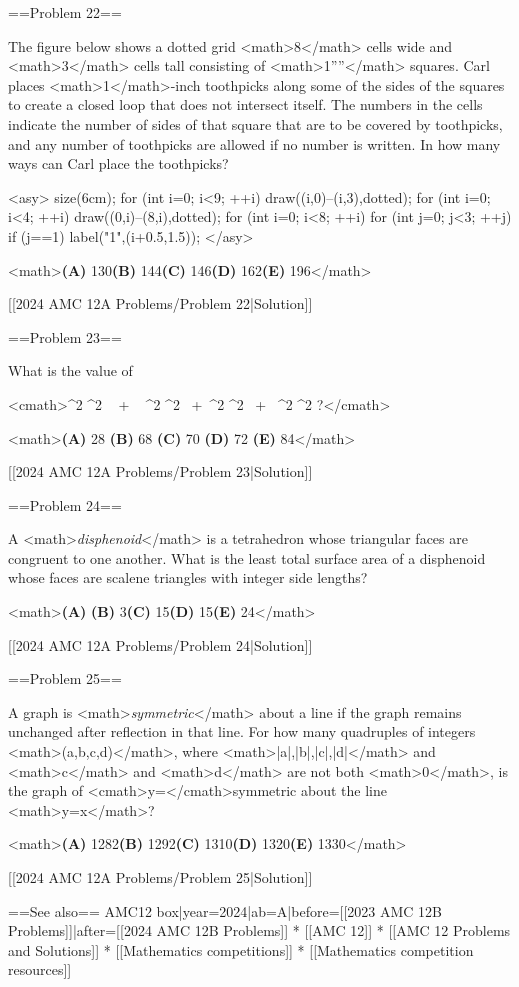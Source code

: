 ==Problem 22==

The figure below shows a dotted grid <math>8</math> cells wide and <math>3</math> cells tall consisting of <math>1''''</math> squares. Carl places <math>1</math>-inch toothpicks along some of the sides of the squares to create a closed loop that does not intersect itself. The numbers in the cells indicate the number of sides of that square that are to be covered by toothpicks, and any number of toothpicks are allowed if no number is written. In how many ways can Carl place the toothpicks?

<asy>
size(6cm);
for (int i=0; i<9; ++i) {
  draw((i,0)--(i,3),dotted);
}
for (int i=0; i<4; ++i){
  draw((0,i)--(8,i),dotted);
}
for (int i=0; i<8; ++i) {
  for (int j=0; j<3; ++j) {
    if (j==1) {
      label("1",(i+0.5,1.5));
}}}
</asy>

<math>\textbf{(A) }130\qquad\textbf{(B) }144\qquad\textbf{(C) }146\qquad\textbf{(D) }162\qquad\textbf{(E) }196</math>

[[2024 AMC 12A Problems/Problem 22|Solution]]

==Problem 23==

What is the value of 

<cmath>\tan^2  \cdot \tan^2 ~ + ~ \tan^2  \cdot \tan^2  ~+~\tan^2  \cdot \tan^2  ~+~ \tan^2  \cdot \tan^2 ?</cmath>

<math>\textbf{(A) } 28 \qquad \textbf{(B) } 68 \qquad \textbf{(C) } 70 \qquad \textbf{(D) } 72 \qquad \textbf{(E) } 84</math>

[[2024 AMC 12A Problems/Problem 23|Solution]]

==Problem 24==

A <math>\textit{disphenoid}</math> is a tetrahedron whose triangular faces are congruent to one another. What is the least total surface area of a disphenoid whose faces are scalene triangles with integer side lengths?

<math>\textbf{(A) }\qquad\textbf{(B) }3\qquad\textbf{(C) }15\qquad\textbf{(D) }15\qquad\textbf{(E) }24</math>

[[2024 AMC 12A Problems/Problem 24|Solution]]

==Problem 25==

A graph is <math>\textit{symmetric}</math> about a line if the graph remains unchanged after reflection in that line. For how many quadruples of integers <math>(a,b,c,d)</math>, where <math>|a|,|b|,|c|,|d|</math> and <math>c</math> and <math>d</math> are not both <math>0</math>, is the graph of <cmath>y=</cmath>symmetric about the line <math>y=x</math>?

<math>\textbf{(A) }1282\qquad\textbf{(B) }1292\qquad\textbf{(C) }1310\qquad\textbf{(D) }1320\qquad\textbf{(E) }1330</math>

[[2024 AMC 12A Problems/Problem 25|Solution]]

==See also==
{{AMC12 box|year=2024|ab=A|before=[[2023 AMC 12B Problems]]|after=[[2024 AMC 12B Problems]]}}
* [[AMC 12]]
* [[AMC 12 Problems and Solutions]]
* [[Mathematics competitions]]
* [[Mathematics competition resources]]